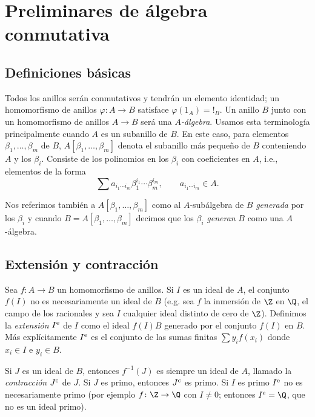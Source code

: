 \chapter{Preliminares de álgebra conmutativa}




\section{Definiciones básicas}

Todos los anillos serán conmutativos y tendrán un elemento identidad; un homomorfismo de anillos $\varphi\colon A \to B$ satisface $\varphi(1_A) = !_B$. Un anillo $B$ junto con un homomorfismo de anillos $A\to B$ será una \emph{$A$-álgebra}. Usamos esta terminología principalmente cuando $A$ es un subanillo de $B$. En este caso, para elementos $\beta_1, \ldots, \beta_m$ de $B$, $A[\beta_1,\ldots,\beta_m]$ denota el subanillo más pequeño de $B$ conteniendo $A$ y los $\beta_i$. Consiste de los polinomios en los $\beta_i$ con coeficientes en $A$, i.e., elementos de la forma
\[
  \sum a_{i_1\cdots i_m} \beta_1^{i_1}\cdots \beta_m^{i_m}, \qquad  a_{i_1\cdots i_m} \in A.
\]

Nos referimos también a $A[\beta_1,\ldots, \beta_m]$ como al $A$-subálgebra de $B$ \emph{generada} por los $\beta_i$ y cuando $B = A[\beta_1,\ldots, \beta_m]$ decimos que los $\beta_i$ \emph{generan} $B$ como una $A$-álgebra.




\section{Extensión y contracción}

Sea $f\colon A \to B$ un homomorfismo de anillos. Si $I$ es un ideal de $A$, el conjunto $f(I)$  no es necesariamente un ideal de $B$ (e.g. sea $f$ la inmersión de $\Z$ en $\Q$, el campo de los racionales y sea $I$ cualquier ideal distinto de cero de $\Z$). Definimos la \emph{extensión} $I^{\mathrm{e}}$ de $I$ como el ideal $f(I)B$ generado por el conjunto $f(I)$ en $B$. Más explícitamente $I^{\mathrm{e}}$ es el conjunto de las sumas finitas $\sum y_i f(x_i)$ donde $x_i \in I$ e $y_i \in B$.

Si $J$ es un ideal de $B$, entonces $f^{-1}(J)$ es siempre un ideal de $A$, llamado la \emph{contracción}  $J^{\mathrm{c}}$ de $J$. Si $J$ es primo, entonces $J^{\mathrm{c}}$ es primo. Si $I$ es primo $I^{\mathrm{e}}$ no es necesariamente primo (por ejemplo $f\colon \Z \to \Q$ con $I\neq 0$; entonces $I^\ext = \Q$, que no es un ideal primo).

